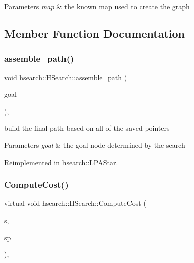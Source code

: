 \begin{DoxyParams}{Parameters}
{\em map} & the known map used to create the graph \\
\hline
\end{DoxyParams}


\subsection{Member Function Documentation}
\mbox{\label{classhsearch_1_1HSearch_ac94c08c0f0d4cc3076f01d70c6cd7679}} 
\subsubsection{\texorpdfstring{assemble\+\_\+path()}{assemble\_path()}}
{\footnotesize\ttfamily void hsearch\+::\+H\+Search\+::assemble\+\_\+path (\begin{DoxyParamCaption}\item[{\hyperlink{structhsearch_1_1SearchNode}{Search\+Node}}]{goal }\end{DoxyParamCaption})\hspace{0.3cm}{\ttfamily [protected]}, {\ttfamily [virtual]}}



build the final path based on all of the saved pointers 


\begin{DoxyParams}{Parameters}
{\em goal} & the goal node determined by the search \\
\hline
\end{DoxyParams}


Reimplemented in \hyperlink{classhsearch_1_1LPAStar_aae9f9031efbe788a83f842905b63e2aa}{hsearch\+::\+L\+P\+A\+Star}.

\mbox{\label{classhsearch_1_1HSearch_a5d325955c4faedaca0c68155fd1f7e69}} 
\subsubsection{\texorpdfstring{Compute\+Cost()}{ComputeCost()}}
{\footnotesize\ttfamily virtual void hsearch\+::\+H\+Search\+::\+Compute\+Cost (\begin{DoxyParamCaption}\item[{\hyperlink{structhsearch_1_1SearchNode}{Search\+Node} \&}]{s,  }\item[{\hyperlink{structhsearch_1_1SearchNode}{Search\+Node} \&}]{sp }\end{DoxyParamCaption})\hspace{0.3cm}{\ttfamily [protected]}, {}}



